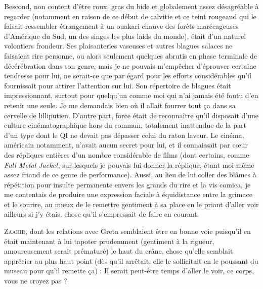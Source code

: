 %
Bescond, non content d’être roux, gras du bide et globalement assez désagréable à regarder (notamment en raison de ce début de calvitie et ce teint rougeaud qui le faisait ressembler étrangement à un ouakari chauve des forêts marécageuses d’Amérique du Sud, un des singes les plus laids du monde), était d’un naturel volontiers frondeur. Ses plaisanteries vaseuses et autres blagues salaces ne faisaient rire personne, ou alors seulement quelques abrutis en phase terminale de décérébration dans son genre, mais je ne pouvais m’empêcher d’éprouver certaine tendresse pour lui, ne serait-ce que par égard pour les efforts considérables qu’il fournissait pour attirer l’attention sur lui. Son répertoire de blagues était impressionnant, surtout pour quelqu’un comme moi qui n’ai jamais été foutu d’en retenir une seule. Je me demandais bien où il allait fourrer tout ça dans sa cervelle de lilliputien. D’autre part, force était de reconnaître qu’il disposait d’une culture cinématographique hors du commun, totalement inattendue de la part d’un type dont le QI ne devait pas dépasser celui du raton laveur. Le cinéma, américain notamment, n’avait aucun secret pour lui, et il connaissait par cœur des répliques entières d’un nombre considérable de films (dont certains, comme \textit{Full Metal Jacket}, sur lesquels je pouvais lui donner la réplique, étant moi-même assez friand de ce genre de performance). Aussi, au lieu de lui coller des blâmes à répétition pour insulte permanente envers les grands du rire et la vis comica, je me contentais de produire une expression faciale à équidistance entre la grimace et le sourire, au mieux de le remettre gentiment à sa place en le priant d’aller voir ailleurs si j’y étais, chose qu’il s’empressait de faire en courant.

\begin{dialogue}
    
\textsc{Zaahid}, dont les relations avec Greta semblaient être en bonne voie puisqu’il en était maintenant à lui tapoter prudemment (gentiment à la rigueur, amoureusement serait prématuré) le haut du crâne, chose qu’elle semblait apprécier au plus haut point (dès qu’il arrêtait, elle le sollicitait en le poussant du museau pour qu’il remette ça) : Il serait peut-être temps d’aller le voir, ce corps, vous ne croyez pas ?
    
\end{dialogue}

